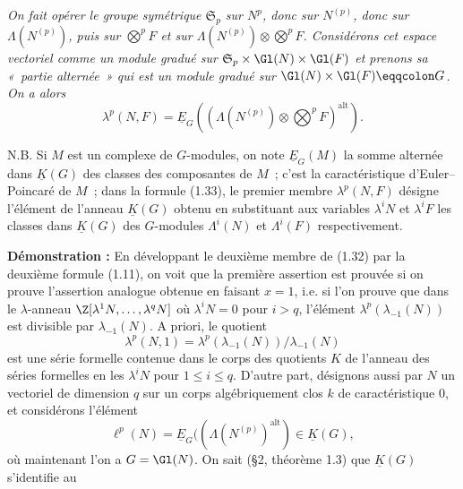 \emph{On fait opérer le groupe symétrique $\mathfrak S_p$ sur $N^p$, donc sur $N^{(p)}$, donc sur $\Lambda(N^{(p)})$, puis sur $\bigotimes^p F$ et sur $\Lambda(N^{(p)})\otimes\bigotimes^p F$. Considérons cet espace vectoriel comme un module gradué sur $\mathfrak S_p\times\Gl(N)\times\Gl(F)$ et prenons sa «~partie alternée~» qui est un module gradué sur $\Gl(N)\times\Gl(F)\eqqcolon G$. On a alors}
\begin{equation}\tag{1.33}
\lambda^p(N,F)=\underline{E}_G\left(\left(\Lambda(N^{(p)})\otimes\bigotimes^p F\right)^{\mathrm{alt}}\right).
\end{equation}

N.B. Si $M$ est un complexe de $G$-modules, on note $\underline{E}_G(M)$ la somme alternée dans $\underline{K}(G)$ des classes des composantes de $M$~; c'est la caractéristique d'Euler--Poincaré de $M$~; dans la formule (1.33), le premier membre $\lambda^p(N,F)$ désigne l'élément de l'anneau $\underline{K}(G)$ obtenu en substituant aux variables $\lambda^iN$ et $\lambda^iF$ les classes dans $\underline{K}(G)$ des $G$-modules $\Lambda^i(N)$ et $\Lambda^i(F)$ respectivement.

\textbf{Démonstration :} En développant le deuxième membre de (1.32) par la deuxième formule (1.11), on voit que la première assertion est prouvée si on prouve l'assertion analogue obtenue en faisant $x=1$, i.e. si l'on prouve que dans le $\lambda$-anneau $\Z[\lambda^1N,\ldots,\lambda^qN]$ où $\lambda^iN=0$ pour $i>q$, l'élément $\lambda^p(\lambda_{-1}(N))$ est divisible par $\lambda_{-1}(N)$. A priori, le quotient
\[
\lambda^p(N,1)=\lambda^p(\lambda_{-1}(N))/\lambda_{-1}(N)
\]
est une série formelle contenue dans le corps des quotients $K$ de l'anneau des séries formelles en les $\lambda^iN$ pour $1\leq i\leq q$. D'autre part, désignons aussi par $N$ un vectoriel de dimension $q$ sur un corps algébriquement clos $k$ de caractéristique $0$, et considérons l'élément
\[
\ell^p(N)=\underline{E}_G((\Lambda(N^{(p)})^{\mathrm{alt}})\in \underline{K}(G),
\]
où maintenant l'on a $G=\Gl(N)$. On sait (\S 2, théorème 1.3) que $\underline{K}(G)$ s'identifie au
